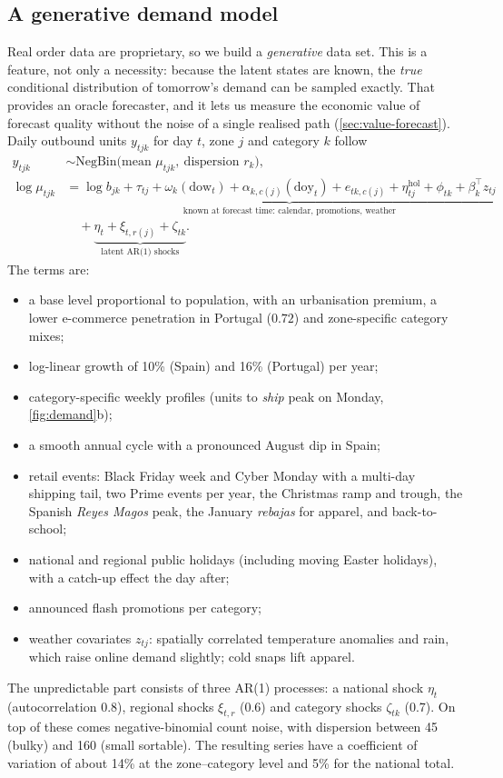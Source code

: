 \subsection{A generative demand model}\label{sec:dgp}
Real order data are proprietary, so we build a \emph{generative} data set.
This is a feature, not only a necessity: because the latent states are known, the \emph{true} conditional distribution of tomorrow's demand can be sampled exactly.
That provides an oracle forecaster, and it lets us measure the economic value of forecast quality without the noise of a single realised path (\cref{sec:value-forecast}).
Daily outbound units $y_{tjk}$ for day $t$, zone $j$ and category $k$ follow
\begin{align}
  y_{tjk} &\sim \mathrm{NegBin}\big(\text{mean } \mu_{tjk},\ \text{dispersion } r_k\big), \nonumber\\
  \log \mu_{tjk} &= \underbrace{\log b_{jk} + \tau_{tj} + \omega_k(\mathrm{dow}_t) + \alpha_{k,c(j)}(\mathrm{doy}_t)
     + e_{tk,c(j)} + \eta^{\mathrm{hol}}_{tj} + \phi_{tk} + \beta^\top_k z_{tj}}_{\text{known at forecast time: calendar, promotions, weather}} \nonumber\\
  &\quad + \underbrace{\eta_t + \xi_{t,r(j)} + \zeta_{tk}}_{\text{latent AR(1) shocks}} .
  \label{eq:dgp}
\end{align}
The terms are:
\begin{itemize}
  \item a base level proportional to population, with an urbanisation premium, a lower e-commerce penetration in Portugal ($0.72$) and zone-specific category mixes;
  \item log-linear growth of 10\% (Spain) and 16\% (Portugal) per year;
  \item category-specific weekly profiles (units to \emph{ship} peak on Monday, \cref{fig:demand}b);
  \item a smooth annual cycle with a pronounced August dip in Spain;
  \item retail events: Black Friday week and Cyber Monday with a multi-day shipping tail, two Prime events per year, the Christmas ramp and trough, the Spanish \emph{Reyes Magos} peak, the January \emph{rebajas} for apparel, and back-to-school;
  \item national and regional public holidays (including moving Easter holidays), with a catch-up effect the day after;
  \item announced flash promotions per category;
  \item weather covariates $z_{tj}$: spatially correlated temperature anomalies and rain, which raise online demand slightly; cold snaps lift apparel.
\end{itemize}
The unpredictable part consists of three AR(1) processes: a national shock $\eta_t$ (autocorrelation 0.8), regional shocks $\xi_{t,r}$ (0.6) and category shocks $\zeta_{tk}$ (0.7).
On top of these comes negative-binomial count noise, with dispersion between 45 (bulky) and 160 (small sortable).
The resulting series have a coefficient of variation of about 14\% at the zone--category level and 5\% for the national total.

